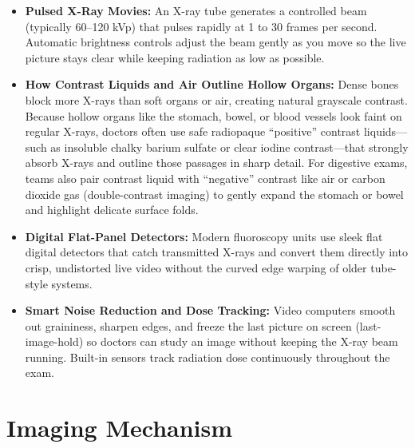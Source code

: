 \begin{itemize}
    \item \textbf{Pulsed X-Ray Movies:} An X-ray tube generates a controlled beam (typically 60--120 kVp) that pulses rapidly at 1 to 30 frames per second. Automatic brightness controls adjust the beam gently as you move so the live picture stays clear while keeping radiation as low as possible.
    \item \textbf{How Contrast Liquids and Air Outline Hollow Organs:} Dense bones block more X-rays than soft organs or air, creating natural grayscale contrast. Because hollow organs like the stomach, bowel, or blood vessels look faint on regular X-rays, doctors often use safe radiopaque ``positive'' contrast liquids---such as insoluble chalky barium sulfate or clear iodine contrast---that strongly absorb X-rays and outline those passages in sharp detail. For digestive exams, teams also pair contrast liquid with ``negative'' contrast like air or carbon dioxide gas (double-contrast imaging) to gently expand the stomach or bowel and highlight delicate surface folds.
    \item \textbf{Digital Flat-Panel Detectors:} Modern fluoroscopy units use sleek flat digital detectors that catch transmitted X-rays and convert them directly into crisp, undistorted live video without the curved edge warping of older tube-style systems.
    \item \textbf{Smart Noise Reduction and Dose Tracking:} Video computers smooth out graininess, sharpen edges, and freeze the last picture on screen (last-image-hold) so doctors can study an image without keeping the X-ray beam running. Built-in sensors track radiation dose continuously throughout the exam.
\end{itemize}

\section{Imaging Mechanism}

